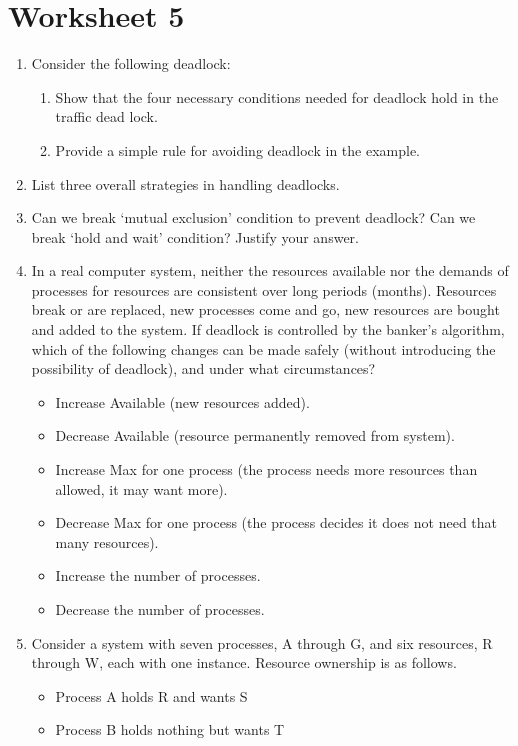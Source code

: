 \documentclass{article}
\begin{document}
	\section{Worksheet 5}
	\begin{enumerate}
		\item Consider the following deadlock:
		\begin{enumerate}
			\item Show that the four necessary conditions needed for deadlock hold in the traffic dead lock.
			\item Provide a simple rule for avoiding deadlock in the example.
		\end{enumerate}
		\item List three overall strategies in handling deadlocks.
		\item Can we break ‘mutual exclusion’ condition to prevent deadlock? Can we break ‘hold and wait’ condition? Justify your answer.
		\item In a real computer system, neither the resources available nor the demands of processes for resources are consistent over long periods (months). Resources break or are replaced, new processes come and go, new resources are bought and added to the system. If deadlock is controlled by the banker’s algorithm, which of the following changes can be made safely (without introducing the possibility of deadlock), and under what circumstances?
		\begin{itemize}
			\item Increase Available (new resources added).
			\item Decrease Available (resource permanently removed from system).
			\item Increase Max for one process (the process needs more resources than allowed, it may want more).
			\item Decrease Max for one process (the process decides it does not need that many resources).
			\item Increase the number of processes.
			\item Decrease the number of processes.
		\end{itemize}
		\item Consider a system with seven processes, A through G, and six resources, R through W, each with one instance. Resource ownership is as follows.
		\begin{itemize}
			\item Process A holds R and wants S
			\item Process B holds nothing but wants T

\end{itemize}
\end{enumerate}
\end{document}
